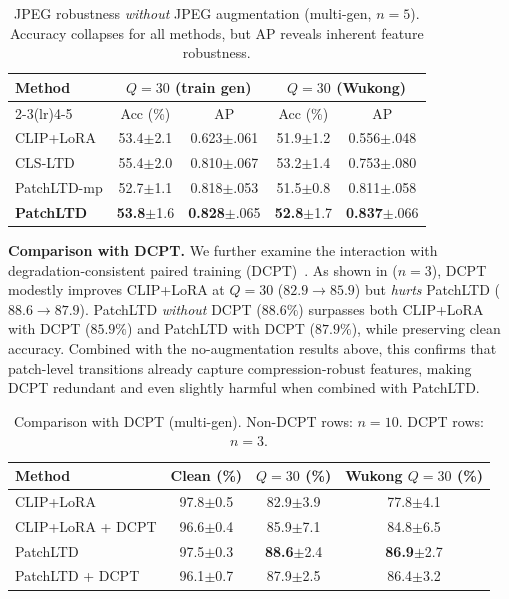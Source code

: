 \documentclass[runningheads]{llncs}
\newcommand{\ours}{PatchLTD}
\begin{document}
\begin{table}[t]
\centering
\caption{JPEG robustness \emph{without} JPEG augmentation (multi-gen, $n{=}5$). Accuracy collapses for all methods, but AP reveals inherent feature robustness.}
\label{tab:noaug}
\setlength{\tabcolsep}{5pt}
\begin{tabular}{lcccc}
\toprule
\multirow{2}{*}{Method} & \multicolumn{2}{c}{$Q{=}30$ (train gen)} & \multicolumn{2}{c}{$Q{=}30$ (Wukong)} \\
\cmidrule(lr){2-3}\cmidrule(lr){4-5}
                        & Acc (\%) & AP    & Acc (\%) & AP \\
\midrule
CLIP+LoRA      & 53.4\scriptsize$\pm$2.1 & 0.623\scriptsize$\pm$.061 & 51.9\scriptsize$\pm$1.2 & 0.556\scriptsize$\pm$.048 \\
CLS-LTD        & 55.4\scriptsize$\pm$2.0 & 0.810\scriptsize$\pm$.067 & 53.2\scriptsize$\pm$1.4 & 0.753\scriptsize$\pm$.080 \\
\ours{}-mp     & 52.7\scriptsize$\pm$1.1 & 0.818\scriptsize$\pm$.053 & 51.5\scriptsize$\pm$0.8 & 0.811\scriptsize$\pm$.058 \\
\textbf{\ours{}} & \textbf{53.8}\scriptsize$\pm$1.6 & \textbf{0.828}\scriptsize$\pm$.065 & \textbf{52.8}\scriptsize$\pm$1.7 & \textbf{0.837}\scriptsize$\pm$.066 \\
\bottomrule
\end{tabular}
\end{table}

\noindent\textbf{Comparison with DCPT.}
We further examine the interaction with degradation-consistent paired training (DCPT)~\cite{dcpt2026}.
As shown in  ($n{=}3$), DCPT modestly improves CLIP+LoRA at $Q{=}30$ ($82.9 \to 85.9$) but \emph{hurts} \ours{} ($88.6 \to 87.9$).
\ours{} \emph{without} DCPT ($88.6\%$) surpasses both CLIP+LoRA with DCPT ($85.9\%$) and \ours{} with DCPT ($87.9\%$), while preserving clean accuracy.
Combined with the no-augmentation results above, this confirms that patch-level transitions already capture compression-robust features, making DCPT redundant and even slightly harmful when combined with \ours{}.

\begin{table}[t]
\centering
\caption{Comparison with DCPT (multi-gen). Non-DCPT rows: $n{=}10$. DCPT rows: $n{=}3$.}
\label{tab:dcpt}
\setlength{\tabcolsep}{5pt}
\begin{tabular}{lccc}
\toprule
Method & Clean (\%) & $Q{=}30$ (\%) & Wukong $Q{=}30$ (\%) \\
\midrule
CLIP+LoRA             & 97.8\scriptsize$\pm$0.5 & 82.9\scriptsize$\pm$3.9 & 77.8\scriptsize$\pm$4.1 \\
CLIP+LoRA + DCPT      & 96.6\scriptsize$\pm$0.4 & 85.9\scriptsize$\pm$7.1 & 84.8\scriptsize$\pm$6.5 \\
\ours{}               & 97.5\scriptsize$\pm$0.3 & \textbf{88.6}\scriptsize$\pm$2.4 & \textbf{86.9}\scriptsize$\pm$2.7 \\
\ours{} + DCPT        & 96.1\scriptsize$\pm$0.7 & 87.9\scriptsize$\pm$2.5 & 86.4\scriptsize$\pm$3.2 \\
\bottomrule
\end{tabular}
\end{table}
\end{document}
